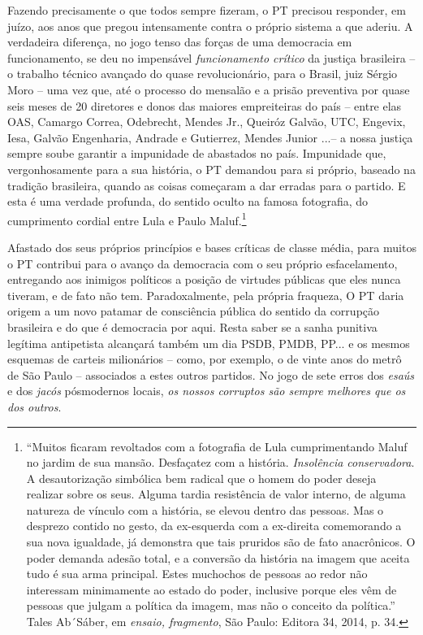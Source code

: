 Fazendo precisamente o que todos sempre fizeram, o PT precisou
responder, em juízo, aos anos que pregou intensamente contra o próprio
sistema a que aderiu. A verdadeira diferença, no jogo tenso das forças
de uma democracia em funcionamento, se deu no impensável
\emph{funcionamento crítico} da justiça brasileira -- o trabalho técnico
avançado do quase revolucionário, para o Brasil, juiz Sérgio Moro -- uma
vez que, até o processo do mensalão e a prisão preventiva por quase seis
meses de 20 diretores e donos das maiores empreiteiras do país -- entre
elas OAS, Camargo Correa, Odebrecht, Mendes Jr., Queiróz Galvão, UTC,
Engevix, Iesa, Galvão Engenharia, Andrade e Gutierrez, Mendes Junior
...-- a nossa justiça sempre soube garantir a impunidade de abastados no
país. Impunidade que, vergonhosamente para a sua história, o PT demandou
para si próprio, baseado na tradição brasileira, quando as coisas
começaram a dar erradas para o partido. E esta é uma verdade profunda,
do sentido oculto na famosa fotografia, do cumprimento cordial entre
Lula e Paulo Maluf.\footnote{``Muitos ficaram revoltados com a
  fotografia de Lula cumprimentando Maluf no jardim de sua mansão.
  Desfaçatez com a história. \emph{Insolência conservadora}. A
  desautorização simbólica bem radical que o homem do poder deseja
  realizar sobre os seus. Alguma tardia resistência de valor interno, de
  alguma natureza de vínculo com a história, se elevou dentro das
  pessoas. Mas o desprezo contido no gesto, da ex-esquerda com a
  ex-direita comemorando a sua nova igualdade, já demonstra que tais
  pruridos são de fato anacrônicos. O poder demanda adesão total, e a
  conversão da história na imagem que aceita tudo é sua arma principal.
  Estes muchochos de pessoas ao redor não interessam minimamente ao
  estado do poder, inclusive porque eles vêm de pessoas que julgam a
  política da imagem, mas não o conceito da política.'' Tales Ab´Sáber,
  em \emph{ensaio, fragmento}, São Paulo: Editora 34, 2014, p. 34.}

Afastado dos seus próprios princípios e bases críticas de classe média,
para muitos o PT contribui para o avanço da democracia com o seu próprio
esfacelamento, entregando aos inimigos políticos a posição de virtudes
públicas que eles nunca tiveram, e de fato não tem. Paradoxalmente, pela
própria fraqueza, O PT daria origem a um novo patamar de consciência
pública do sentido da corrupção brasileira e do que é democracia por
aqui. Resta saber se a sanha punitiva legítima antipetista alcançará
também um dia PSDB, PMDB, PP... e os mesmos esquemas de carteis
milionários -- como, por exemplo, o de vinte anos do metrô de São Paulo
-- associados a estes outros partidos. No jogo de sete erros dos
\emph{esaús} e dos \emph{jacós} pósmodernos locais, \emph{os nossos
corruptos são sempre melhores que os dos outros}.

